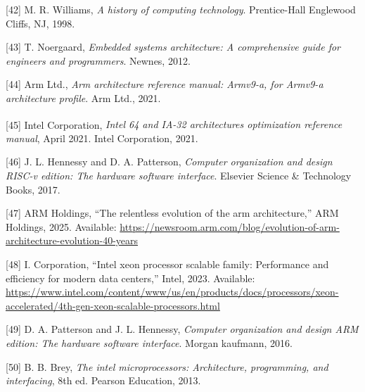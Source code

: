 \documentclass[12pt,oneside]{templates/unerthesis}
\newcommand{\CSLLeftMargin}[1]{#1} %
\newcommand{\CSLRightInline}[1]{#1} %
\newlength{\cslhangindent}
\newenvironment{CSLReferences}[2] %
 {\setlength{\parindent}{0pt}%
  \setlength{\leftskip}{#1 pt\relax}%
  \setlength{\parskip}{#2 pt\relax}%
  \everypar{\setlength{\hangindent}{\cslhangindent}}}
 {\par}
\begin{document}
\begin{CSLReferences}{0}{0}
\leavevmode{}%
\CSLLeftMargin{{[}42{]} }%
\CSLRightInline{M. R. Williams, \emph{A history of computing technology}. Prentice-Hall Englewood Cliffs, NJ, 1998.}

\leavevmode{}%
\CSLLeftMargin{{[}43{]} }%
\CSLRightInline{T. Noergaard, \emph{Embedded systems architecture: A comprehensive guide for engineers and programmers}. Newnes, 2012.}

\leavevmode{}%
\CSLLeftMargin{{[}44{]} }%
\CSLRightInline{Arm Ltd., \emph{Arm architecture reference manual: Armv9-a, for Armv9-a architecture profile}. Arm Ltd., 2021.}

\leavevmode{}%
\CSLLeftMargin{{[}45{]} }%
\CSLRightInline{Intel Corporation, \emph{Intel\textsuperscript{\textregistered} 64 and IA-32 architectures optimization reference manual}, April 2021. Intel Corporation, 2021.}

\leavevmode{}%
\CSLLeftMargin{{[}46{]} }%
\CSLRightInline{J. L. Hennessy and D. A. Patterson, \emph{Computer organization and design RISC-v edition: The hardware software interface}. Elsevier Science \& Technology Books, 2017.}

\leavevmode{}%
\CSLLeftMargin{{[}47{]} }%
\CSLRightInline{ARM Holdings, {``The relentless evolution of the arm architecture,''} ARM Holdings, 2025. Available: \url{https://newsroom.arm.com/blog/evolution-of-arm-architecture-evolution-40-years}}

\leavevmode{}%
\CSLLeftMargin{{[}48{]} }%
\CSLRightInline{I. Corporation, {``Intel xeon processor scalable family: Performance and efficiency for modern data centers,''} Intel, 2023. Available: \url{https://www.intel.com/content/www/us/en/products/docs/processors/xeon-accelerated/4th-gen-xeon-scalable-processors.html}}

\leavevmode{}%
\CSLLeftMargin{{[}49{]} }%
\CSLRightInline{D. A. Patterson and J. L. Hennessy, \emph{Computer organization and design ARM edition: The hardware software interface}. Morgan kaufmann, 2016.}

\leavevmode{}%
\CSLLeftMargin{{[}50{]} }%
\CSLRightInline{B. B. Brey, \emph{The intel microprocessors: Architecture, programming, and interfacing}, 8th ed. Pearson Education, 2013.}


\end{CSLReferences}
\end{document}
